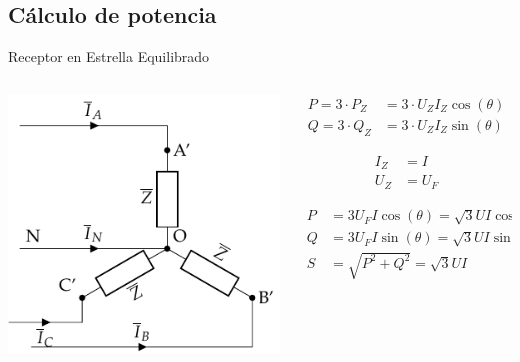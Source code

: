 \documentclass[aspectratio=169, usenames,svgnames,dvipsnames]{beamer}
\begin{document}
\subsection{Cálculo de potencia}
\label{sec:org15b8c8a}
\begin{frame}[label={sec:orgb3bf385}]{Receptor en Estrella Equilibrado}
\begin{columns}
\begin{column}{0.5\columnwidth}
\begin{center}
\includegraphics[width=.9\linewidth]{../figs/EstrellaEquilibrado_Receptor.pdf}
\end{center}
\end{column}

\begin{column}{0.5\columnwidth}
\begin{align*}
  P = 3 \cdot P_Z &= 3 \cdot U_Z I_Z \cos(\theta)\\
  Q = 3 \cdot Q_Z &= 3 \cdot U_Z I_Z \sin(\theta)
\end{align*}

\begin{align*}
  I_Z &= I\\
  U_Z &= U_F
\end{align*}


\begin{align*}
  P &= 3 U_F I \cos(\theta) = \sqrt{3} U I \cos(\theta)\\
  Q &= 3 U_F I \sin(\theta) = \sqrt{3} U I \sin(\theta)\\
  S &= \sqrt{P^2 + Q^2} =  \sqrt{3} U I
\end{align*}
\end{column}
\end{columns}
\end{frame}
\end{document}
